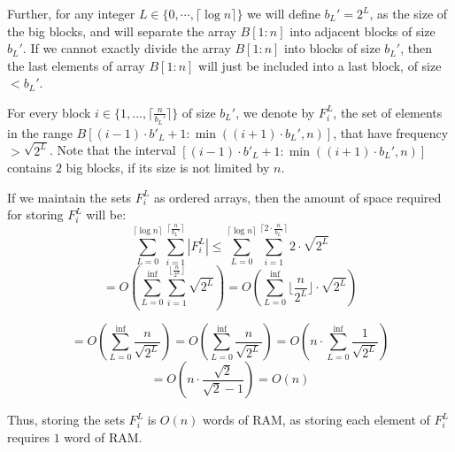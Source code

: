 \documentclass[runningheads]{llncs}
\begin{document}
Further, for any integer $L \in \{ 0 , \cdots , \lceil  \log n \rceil \}$ we will define $b_L'=2^L$, as the size of the big blocks, and will separate the array $B[1:n]$ into adjacent blocks of size $b_L'$.
If we cannot exactly divide the array $B[1:n]$ into blocks of size $b_L'$, then the last elements of array $B[1:n]$ will just be included into a last block, of size $<b_L'$.

For every block $i\in\{ 1,\dots,\lceil \frac{n}{b_L'} \rceil \}$ of size $b_L'$, we denote by $F_i^L$, the set of elements in the range $B[(i-1) \cdot b'_L +1: \min((i+1)\cdot b_L' , n)]$, that have frequency $>\sqrt{2^L}$. 
Note that the interval $[(i-1) \cdot b'_L +1: \min((i+1)\cdot b_L' , n)]$ contains $2$ big blocks, if its size is not limited by $n$.  

If we maintain the sets $F_i^L$ as ordered arrays, then the amount of space required for storing $F_i^L$ will be:
\[
    \sum_{L=0}^{\lceil \log n \rceil} \sum_{i=1}^{\lceil \frac{n}{b_L'}\rceil } |F_i^L| \leq \sum_{L=0}^{\lceil \log n \rceil} \sum_{i=1}^{\lceil 2 \cdot \frac{n}{b_L'}\rceil } 2\cdot \sqrt{2^L} 
\]
\[
    = O(  \sum_{L=0}^{\inf} \sum_{i=1}^{ \lfloor \frac{n}{2^L} \rfloor } \sqrt{2^L} ) = O( \sum_{L=0}^{\inf} \lfloor \frac{n}{2^L} \rfloor \cdot \sqrt{2^L} )
\]

\[
    = O( \sum_{L=0}^{\inf} \frac{n}{\sqrt{2^L}} ) = O( \sum_{L=0}^{\inf} \frac{n}{\sqrt{2^L}}  ) = O( n \cdot \sum_{L=0}^{\inf} \frac{1}{\sqrt{2^L}}  )
\]
\[
    = O( n \cdot \frac{ \sqrt{2} }{ \sqrt{2} - 1 }  ) = O(n)
\]


Thus, storing the sets $F_i^L$ is $O(n)$ words of RAM, as storing each element of $F_i^L$ requires $1$ word of RAM.
\end{document}
